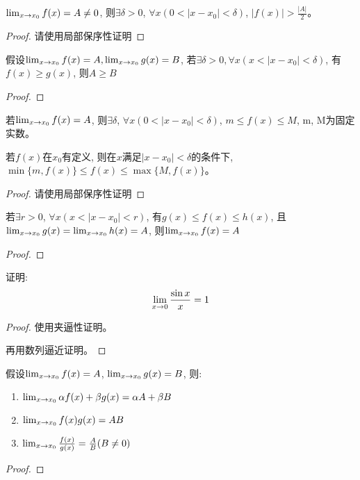 \documentclass[lang=cn]{elegantbook}
\begin{document}
\begin{lemma}
    $\lim_{x \to x_0 } f(x) = A \neq 0$, 则$\exists \delta > 0$, $\forall x ( 0 < \left| x - x_0\right| < \delta)$, $\left| f(x) \right| > \frac{\left| A \right|}{2}$。
\end{lemma}
\begin{proof}
    请使用局部保序性证明
\end{proof}

\begin{lemma}
    假设$\lim_{x \to x_0 } f(x) = A, \lim_{x \to x_0 } g(x) = B$, 若$\exists \delta > 0, \forall x (x < \left| x - x_0\right| < \delta)$, 有$f(x) \ge g(x)$, 则$A \ge B$
\end{lemma}
\begin{proof}

\end{proof}


\begin{theorem}[函数极限的局部有界性]
    若$\lim_{x \to x_0 } f(x) = A$, 则$\exists \delta$, $\forall x(0 < \left| x - x_0 \right| < \delta)$, $m \le f(x) \le M$, m, M为固定实数。

    若$f(x)$在$x_0$有定义, 则在$x$满足$\left| x - x_0 \right| < \delta$的条件下, $\min\{m, f(x)\} \le f(x) \le \max\{M, f(x)\}$。
\end{theorem}
\begin{proof}
    请使用局部保序性证明
\end{proof}

\begin{theorem}[函数极限的夹逼性定理]
    若$\exists r > 0$, $\forall x(x < \left| x - x_0 \right| < r)$, 有$g(x) \le f(x) \le h(x)$, 且$\lim_{x \to x_0 } g(x) = \lim_{x \to x_0 } h(x) = A$, 则$\lim_{x \to x_0 } f(x) = A$
\end{theorem}
\begin{proof}
    
\end{proof}

\begin{proposition}
    证明: 
    \[ \lim_{x \to 0 } \frac{\sin x}{x} = 1 \]
\end{proposition}
\begin{proof}
    使用夹逼性证明。

    再用数列逼近证明。
\end{proof}

\begin{theorem}[函数极限四则运算]
    假设$\lim_{x \to x_0 } f(x) = A$, $\lim_{x \to x_0 } g(x) = B$, 则: 
    \begin{enumerate}
        \item $\lim_{x \to x_0 } \alpha f(x) + \beta g(x) = \alpha A + \beta B$
        \item $\lim_{x \to x_0 } f(x)g(x) = AB$
        \item $\lim_{x \to x_0 } \frac{f(x)}{g(x)} = \frac{A}{B}(B \neq 0)$
    \end{enumerate}
\end{theorem}
\begin{proof}
    
\end{proof}
\end{document}
